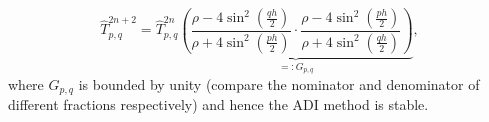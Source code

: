\documentclass[a4aper,pagesize]{scrartcl}
\theoremstyle{definition}
\theoremstyle{plain}
\theoremstyle{remark}
\renewcommand{\hat}{\widehat}
\begin{document}
\begin{equation}
	\hat{T}_{p,q}^{2n+2}
	=
	\hat{T}_{p,q}^{2n}
	\underbrace{
		\left(
			\frac{
				\rho-4\sin^2\left(\frac{qh}{2}\right)
			}{
				\rho+4\sin^2\left(\frac{ph}{2}\right)
			}
			\cdot
			\frac{
				\rho-4\sin^2\left(\frac{ph}{2}\right)
			}{
				\rho+4\sin^2\left(\frac{qh}{2}\right)
			}
		\right)
	}_{=:G_{p,q}},
\end{equation}
where $G_{p,q}$ is bounded by unity (compare the nominator and denominator of different fractions respectively) and hence the ADI method is stable.
\end{document}
